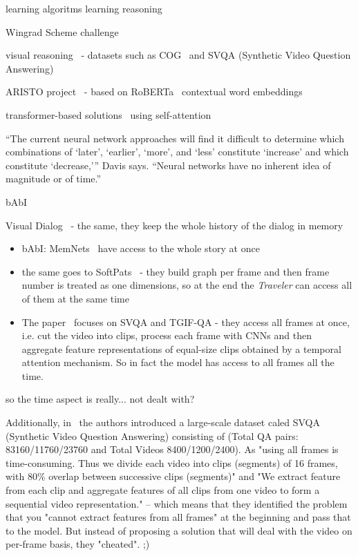 learning algoritms
learning reasoning~\cite{graves2016hybrid}


Wingrad Scheme challenge~\cite{levesque2012winograd}

visual reasoning~\cite{mogadala2019trends} - datasets such as COG~\cite{yang2018dataset} and 
SVQA (Synthetic Video Question Answering)~\cite{song2018explore}


ARISTO project~\cite{clark2019f} - based on RoBERTa~\cite{liu2019roberta} contextual word embeddings

transformer-based solutions~\cite{vaswani2017attention} using self-attention


“The current neural network approaches will find it difficult to determine which combinations of ‘later’, ‘earlier’, ‘more’, and ‘less’ constitute ‘increase’ and which constitute ‘decrease,'” Davis says. “Neural networks have no inherent idea of magnitude or of time.”
~\cite{davis2016write}

bAbI~\cite{weston2015towards}

Visual Dialog~\cite{das2017visual} - the same, they keep the whole history of the dialog in memory

\begin{itemize}
\item bAbI:  MemNets~\cite{weston2014memory} have access to the whole story at once
\item the same goes to SoftPats~\cite{haurilet2019s} - they build graph per frame and then frame number is treated as one dimensions, so at the end the \textit{Traveler} can access all of them at the same time 
\item The paper~\cite{le2019learning} focuses on SVQA and TGIF-QA -  they access all frames at once, i.e. cut the video into clips, process each frame with CNNs and then aggregate feature representations of equal-size clips obtained by a temporal attention mechanism. So in fact the model has access to all frames all the time.
\end{itemize}
so the time aspect is really... not dealt with?

Additionally, in~\cite{song2018explore} the authors introduced a large-scale dataset caled SVQA (Synthetic Video Question Answering) consisting of (Total QA pairs: 83160/11760/23760 and Total Videos 8400/1200/2400).
As "using all frames is time-consuming. Thus we divide each video into clips (segments) of 16 frames, with 80\% overlap between successive clips (segments)" and "We extract feature from each clip and aggregate features of all clips from one video to form a sequential video representation." -- which means that they identified the problem that you "cannot extract features from all frames" at the beginning and pass that to the model. But instead of proposing a solution that will deal with the video on per-frame basis, they "cheated". ;)


